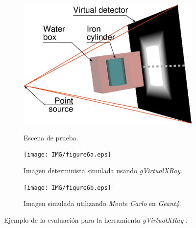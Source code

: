 \begin{figure}[ht]
    \begin{subfigure}[b]{0.25\linewidth}
        \centering
        {\includegraphics[width=0.8\linewidth]{IMG/figure3a.eps}}
        \caption{\label{subfig:polychromatismA} Escena de prueba.}
    \end{subfigure}
    \null\hfill
     \begin{subfigure}[b]{0.25\linewidth}
        \centering
        {\texttt{[image: IMG/figure6a.eps]}}
        \caption{\label{subfig:GPU} Imagen determinista simulada  usando \emph{gVirtualXRay}.}
    \end{subfigure}
    \null\hfill
    \begin{subfigure}[b]{0.25\linewidth}
        \centering
        {\texttt{[image: IMG/figure6b.eps]}}
        \caption{\label{subfig:Gate} Imagen simulada utilizando \emph{Monte Carlo} en \emph{Geant4}.}
    \end{subfigure}

\caption{\label{fig:validation} Ejemplo de la evaluación para la herramienta \emph{gVirtualXRay} \cite{sujar:hal}.}
\end{figure}











